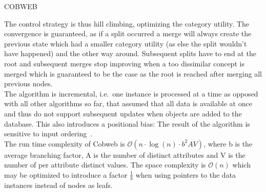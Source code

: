 \begin{algorithm}[htp]
    \hrulealg
\caption{COBWEB}\label{cobweb}
\end{algorithm}

\noindent The control strategy is thus hill climbing, optimizing the category utility. The convergence is guaranteed, as if a split occurred a merge will always create the previous state which had a smaller category utility (as else the split wouldn't have happened) and the other way around. Subsequent splits have to end at the root and subsequent merges stop improving when a too dissimilar concept is merged which is guaranteed to be the case as the root is reached after merging all previous nodes. \\

\noindent The algorithm is incremental, i.e.~one instance is processed at a time as opposed with all other algorithms so far, that assumed that all data is available at once and thus do not support subsequent updates when objects are added to the database. This also introduces a positional bias: The result of the algorithm is sensitive to input ordering~\cite{classit}. \\

\noindent The run time complexity of Cobweb is $\mathcal{O}(n \cdot \log (n) \cdot b^2 AV)$, where b is the average branching factor, A is the number of distinct attributes and V is the number of per attribute distinct values. The space complexity is $\mathcal{O}(n)$ which may be optimized to introduce a factor $\frac{1}{b}$ when using pointers to the data instances instead of nodes as leafs.

